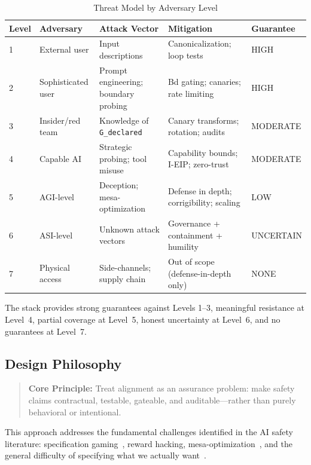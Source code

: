 \documentclass[11pt,letterpaper]{article}
\theoremstyle{definition}
\theoremstyle{remark}
\begin{document}
\begin{table}[h]
\centering
\small
\begin{tabular}{@{}lllll@{}}
\toprule
\textbf{Level} & \textbf{Adversary} & \textbf{Attack Vector} & \textbf{Mitigation} & \textbf{Guarantee} \\
\midrule
1 & External user & Input descriptions & Canonicalization; loop tests & HIGH \\
2 & Sophisticated user & Prompt engineering; boundary probing & Bd gating; canaries; rate limiting & HIGH \\
3 & Insider/red team & Knowledge of \texttt{G\_declared} & Canary transforms; rotation; audits & MODERATE \\
4 & Capable AI & Strategic probing; tool misuse & Capability bounds; I-EIP; zero-trust & MODERATE \\
5 & AGI-level & Deception; mesa-optimization & Defense in depth; corrigibility; scaling & LOW \\
6 & ASI-level & Unknown attack vectors & Governance + containment + humility & UNCERTAIN \\
7 & Physical access & Side-channels; supply chain & Out of scope (defense-in-depth only) & NONE \\
\bottomrule
\end{tabular}
\caption{Threat Model by Adversary Level}
\end{table}

The stack provides strong guarantees against Levels 1--3, meaningful resistance at Level~4, partial coverage at Level~5, honest uncertainty at Level~6, and no guarantees at Level~7.

\subsection{Design Philosophy}

\begin{quote}
\textbf{Core Principle:} Treat alignment as an assurance problem: make safety claims contractual, testable, gateable, and auditable---rather than purely behavioral or intentional.
\end{quote}

This approach addresses the fundamental challenges identified in the AI safety literature: specification gaming~\cite{krakovna2020}, reward hacking, mesa-optimization~\cite{hubinger2019}, and the general difficulty of specifying what we actually want~\cite{amodei2016,russell2019}.
\end{document}
